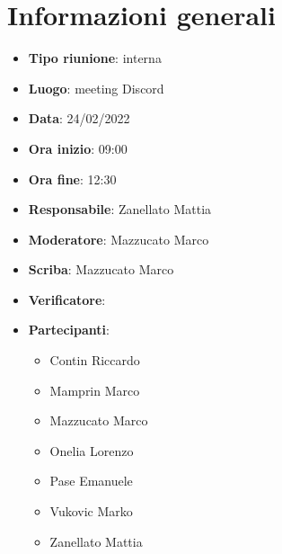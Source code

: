 \section{Informazioni generali}
\begin{itemize}
  \item \textbf{Tipo riunione}: interna
  \item \textbf{Luogo}: meeting Discord
  \item \textbf{Data}: 24/02/2022
  \item \textbf{Ora inizio}: 09:00
  \item \textbf{Ora fine}: 12:30
  \item \textbf{Responsabile}: Zanellato Mattia
  \item \textbf{Moderatore}: Mazzucato Marco
  \item \textbf{Scriba}: Mazzucato Marco
  \item \textbf{Verificatore}:
  \item \textbf{Partecipanti}:
  \begin{itemize}
    \item Contin Riccardo
    \item Mamprin Marco
    \item Mazzucato Marco
    \item Onelia Lorenzo
    \item Pase Emanuele
    \item Vukovic Marko
    \item Zanellato Mattia
  \end{itemize}
\end{itemize}
